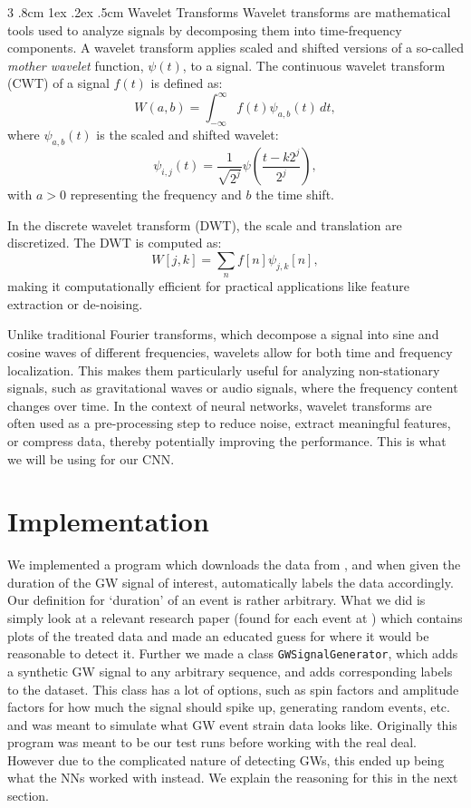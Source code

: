\documentclass[%
reprint,
amsmath,amssymb,
aps,
]{revtex4-2}
\makeatletter
\renewcommand{\subsubsection}{%
	\@startsection
	{subsubsection}%
	{3}%
	{\z@}%
	{.8cm \@plus1ex \@minus .2ex}%
	{.5cm}%
	{\normalfont\small\centering}%
}
\makeatother
\begin{document}
\subsubsection{Wavelet Transforms}
Wavelet transforms are mathematical tools used to analyze signals by decomposing them into time-frequency components. A wavelet transform applies scaled and shifted versions of a so-called \textit{mother wavelet} function, $\psi(t)$, to a signal. The continuous wavelet transform (CWT) of a signal $f(t)$ is defined as:
\[W(a,b)=\int_{-\infty}^{\infty}f(t)\psi_{a,b}(t)\,dt,\]
where $\psi_{a,b}(t)$ is the scaled and shifted wavelet:
\[\psi_{i,j}(t)=\frac{1}{\sqrt{2^j}}\psi\left(\frac{t-k2^j}{2^j}\right),\]
with $a>0$ representing the frequency and $b$ the time shift.  

In the discrete wavelet transform (DWT), the scale and translation are discretized. The DWT is computed as:
\[W[j,k]=\sum_{n}f[n]\psi_{j,k}[n],\]
making it computationally efficient for practical applications like feature extraction or de-noising. 

Unlike traditional Fourier transforms, which decompose a signal into sine and cosine waves of different frequencies, wavelets allow for both time and frequency localization. This makes them particularly useful for analyzing non-stationary signals, such as gravitational waves or audio signals, where the frequency content changes over time. In the context of neural networks, wavelet transforms are often used as a pre-processing step to reduce noise, extract meaningful features, or compress data, thereby potentially improving the performance. This is what we will be using for our CNN.

\section{Implementation}
\label{sec:implementation}
We implemented a program which downloads the data from \cite{gwosc}, and when given the duration of the GW signal of interest, automatically labels the data accordingly. Our definition for `duration' of an event is rather arbitrary. What we did is simply look at a relevant research paper (found for each event at \cite{gwosc_all_events}) which contains plots of the treated data and made an educated guess for where it would be reasonable to detect it. Further we made a class \texttt{GWSignalGenerator}, which adds a synthetic GW signal to any arbitrary sequence, and adds corresponding labels to the dataset. This class has a lot of options, such as spin factors and amplitude factors for how much the signal should spike up, generating random events, etc. and was meant to simulate what GW event strain data looks like. Originally this program was meant to be our test runs before working with the real deal. However due to the complicated nature of detecting GWs, this ended up being what the NNs worked with instead. We explain the reasoning for this in the next section.
\end{document}
